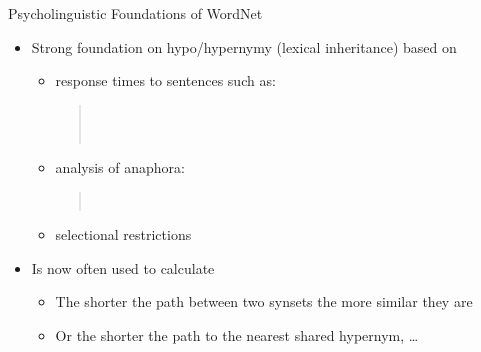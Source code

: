 \begin{frame}{Psycholinguistic Foundations of WordNet}

\MyLogo{}

\begin{itemize}
\item Strong foundation on hypo/hypernymy (lexical inheritance) based on
  \begin{itemize}
  \item   response times to sentences such as:
    \begin{quote}%
      \\
      \\
    \end{quote}
  \item analysis of anaphora:
    \begin{quote}%
      \\
    \end{quote}
  \item selectional restrictions
  \end{itemize}
\item Is now often used to calculate 
  \begin{itemize}
  \item The shorter the path between two synsets the more similar they are
  \item Or the shorter the path to the nearest shared hypernym, \ldots
  \end{itemize}
\end{itemize}
\end{frame}

